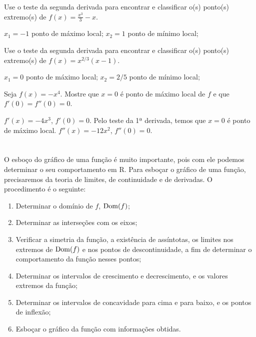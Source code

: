 \cleardoublepage\documentclass[../main.tex]{subfiles}
\begin{document}
\begin{exer}
  Use o teste da segunda derivada para encontrar e classificar o(s) ponto(s) extremo(s) de $\displaystyle f(x) = \frac{x^3}{3}-x$.
\end{exer}
\begin{resp}
  $x_1=-1$ ponto de máximo local; $x_2=1$ ponto de mínimo local;
\end{resp}

\begin{exer}
  Use o teste da segunda derivada para encontrar e classificar o(s) ponto(s) extremo(s) de $\displaystyle f(x) = x^{2/3}(x-1)$.
\end{exer}
\begin{resp}
  $x_1=0$ ponto de máximo local; $x_2=2/5$ ponto de mínimo local;
\end{resp}

\begin{exer}
  Seja $f(x) = -x^4$. Mostre que $x=0$ é ponto de máximo local de $f$ e que $f'(0) = f''(0) = 0$.
\end{exer}
\begin{resp}
  $f'(x) = -4x^3$, $f'(0)=0$. Pelo teste da 1ª derivada, temos que $x=0$ é ponto de máximo local. $f''(x) = -12x^2$, $f''(0)=0$.
\end{resp}
\section[\formula{Esboçando o gráfico de uma função $y = f(x)$}]{}
O esboço do gráfico de uma função é muito importante, pois com ele podemos determinar o seu
comportamento em R. Para esboçar o gráfico de uma função, precisaremos da teoria de limites, de
continuidade e de derivadas. O procedimento é o seguinte:
\begin{enumerate}[1.]
\item Determinar o domínio de \(f\), \({\rm Dom}(f)\);
\item Determinar as interseções com os eixos;
\item Verificar a simetria da função, a existência de assíntotas, os limites nos extremos de \({\rm Dom}(f)\) e nos pontos de descontinuidade, a fim de determinar o comportamento da função nesses pontos;
\item Determinar os intervalos de crescimento e decrescimento, e os valores extremos da função;
\item Determinar os intervalos de concavidade para cima e para baixo, e os pontos de inflexão;
\item Esboçar o gráfico da função com informações obtidas.
\end{enumerate}
\end{document}
